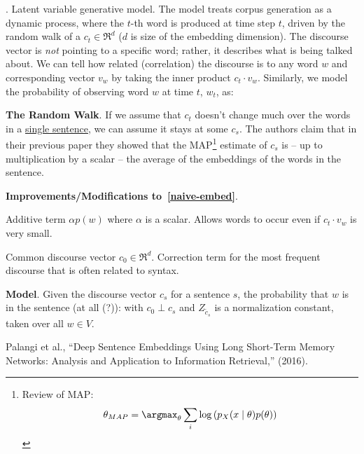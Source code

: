 \documentclass[11pt]{article}
\begin{document}
\myspace
\p {}. Latent variable generative model. The model treats corpus generation as a dynamic process, where the $t$-th word is produced at time step $t$, driven by the random walk of a  $c_t \in \Re^d$ ($d$ is size of the embedding dimension). The discourse vector is \textit{not} pointing to a specific word; rather, it describes what is being talked about. We can tell how related (correlation) the discourse is to any word $w$ and corresponding vector $v_w$ by taking the inner product $c_t \cdot v_w$. Similarly, we model the probability of observing word $w$ at time $t$, $w_t$, as:
\begin{compactitem}
	\item \textbf{The Random Walk}. If we assume that $c_t$ doesn't change much over the words in a \underline{single sentence}, we can assume it stays at some $c_s$. The authors claim that in their previous paper they showed that the MAP\footnote{Review of MAP: $$ \theta_{MAP} = \argmax_\theta \sum_i \log\left(p_X(x \mid \theta) p(\theta) \right)$$ } estimate of $c_s$ is -- up to multiplication by a scalar -- the average of the embeddings of the words in the sentence.
	
	\item \textbf{Improvements/Modifications to~\ref{naive-embed}}. 
	\begin{compactenum}
		\item Additive term $\alpha p(w)$ where $\alpha$ is a scalar. Allows words to occur even if $c_t \cdot v_w$ is very small.
		\item Common discourse vector $c_0 \in \Re^d$. Correction term for the most frequent discourse that is often related to syntax.
	\end{compactenum}
	
	\item \textbf{Model}. Given the discourse vector $c_s$ for a sentence $s$, the probability that $w$ is in the sentence (at all (?)):
	with $c_0 \perp c_s$ and $Z_{\tilde c_s}$ is a normalization constant, taken over all $w \in V$. 
	
\end{compactitem}



\vspace{-1em}
{\footnotesize Palangi et al., ``Deep Sentence Embeddings Using Long Short-Term Memory Networks: Analysis and Application to Information Retrieval,'' (2016).}
\end{document}
